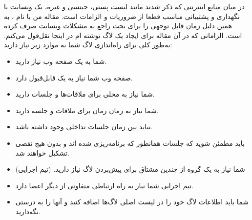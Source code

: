 در میان منابع اینترنتی که ذکر شدند مانند لیست پستی، جیتسی و غیره، یک وبسایت
با نگهداری و پشتیبانی مناسب قطعا از ضروریات و الزامات است. مقاله من با نام
،
به همین دلیل زمان قابل توجهی را برای بحث راجع به مشکلات وبسایت صرف کرده است.
الزاماتی که در آن مقاله برای ایجاد یک لاگ نوشته ام در اینجا نقل‌قول می‌کنم.
به‌طور کلی برای راه‌اندازی لاگ شما به موارد زیر نیاز دارید:


\begin{itemize}
\item
شما به یک صفحه وب نیاز دارید.
\item
صفحه وب شما نیاز به یک  قابل‌قبول دارد.
\item
شما نیاز به محلی برای ملاقات‌ها و جلسات دارید.
\item
شما نیاز به زمان زمان برای ملاقات و جلسه دارید.
\item
نباید بین زمان جلسات تداخلی وجود داشته باشد.
\item
باید مطمئن شوید که جلسات همانطور که برنامه‌ریزی شده اند و بدون هیچ نقصی تشکیل خواهند شد.
\item
شما نیاز به یک گروه از چندین مشتاق برای پیش‌بردن لاگ نیاز دارید. (تیم اجرایی)
\item
تیم اجرایی شما نیاز به راه ارتباطی متفاوتی از دیگر اعضا دارد.
\item
شما باید اطلاعات لاگ خود را در لیست اصلی لاگ‌ها اضافه کنید و آنها را به درستی نگه‌دارید.

\end{itemize}
